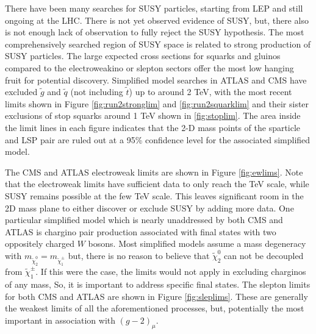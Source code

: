 There have been many searches for SUSY particles, starting from  LEP and still ongoing at the LHC. There is not yet observed evidence of SUSY, but, there also is not enough lack of observation to fully reject the SUSY hypothesis. The most comprehensively searched region of SUSY space is related to strong production of SUSY particles. The large expected cross sections for squarks and gluinos compared to the electroweakino or slepton sectors offer the most low hanging fruit for potential discovery.
Simplified model searches in ATLAS and CMS have excluded $\tilde{g}$ and $\tilde{q}$ (not including $\tilde{t}$) up to around 2 TeV, with the most recent limits shown in Figure \ref{fig:run2stronglim} and \ref{fig:run2squarklim} and their sister exclusions of stop squarks around 1 TeV shown in \ref{fig:stoplim}. The area inside the limit lines in each figure indicates that the 2-D mass points of the sparticle and LSP pair are ruled out at a 95\% confidence level for the associated simplified model.



The CMS and ATLAS electroweak limits are shown in Figure \ref{fig:ewlims}. Note that the electroweak limits have sufficient data to only reach the TeV scale, while SUSY remains possible at the few TeV scale. This leaves significant room in the 2D mass plane to either discover or exclude SUSY by adding more data. One particular simplified model which is nearly unaddressed by both CMS and ATLAS is chargino pair production associated with final states with two oppositely charged $W$ bosons.  Most simplified models assume a mass degeneracy with $m_{\tilde{\chi}^0_2} = m_{\tilde{\chi}^\pm_1}$ but, there is no reason to believe that $\tilde{\chi}^0_2$ can not be decoupled from $\tilde{\chi}^\pm_1$. If this were the case, the limits would not apply in excluding charginos of any mass, So, it is important to address specific final states. The slepton limits  for both CMS and ATLAS are shown in Figure \ref{fig:sleplims}. These are generally the weakest limits of all the aforementioned processes, but, potentially the most important in association with $(g-2)_\mu$.




